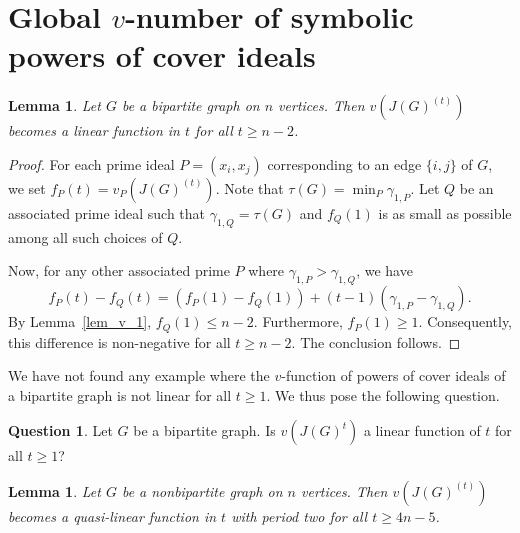 \documentclass[12pt,amscd]{amsart}
\newtheorem{lem}[thm]{Lemma}
\theoremstyle{definition}
\newtheorem{quest}[thm]{Question}
\numberwithin{equation}{section}
\begin{document}
\section{Global $v$-number of symbolic powers of cover ideals}

\begin{lem} \label{lem:2} 
Let $G$ be a bipartite graph on $n$ vertices. Then $v(J(G)^{(t)})$ becomes a linear function in $t$ for all $t \ge n-2$.
\end{lem}

\begin{proof} 
For each prime ideal $P = (x_i,x_j)$ corresponding to an edge $\{i,j\}$ of $G$, we set $f_P(t) = v_P(J(G)^{(t)})$. Note that $\tau(G) = \min_{P} \gamma_{1,P}$. Let $Q$ be an associated prime ideal such that $\gamma_{1,Q} = \tau(G)$ and $f_Q(1)$ is as small as possible among all such choices of $Q$.

Now, for any other associated prime $P$ where $\gamma_{1,P} > \gamma_{1,Q}$, we have 
\[
f_P(t) - f_Q(t) = (f_P(1) - f_Q(1)) + (t-1)(\gamma_{1,P} - \gamma_{1,Q}).
\]
By Lemma~\ref{lem_v_1}, $f_Q(1) \le n-2$. Furthermore, $f_P(1) \ge 1$. Consequently, this difference is non-negative for all $t \ge n-2$. The conclusion follows.
\end{proof}

We have not found any example where the $v$-function of powers of cover ideals of a bipartite graph is not linear for all $t \ge 1$. We thus pose the following question.

\begin{quest} Let $G$ be a bipartite graph. Is $v(J(G)^{t})$ a linear function of $t$ for all $t \ge 1$?
\end{quest}

\begin{lem} \label{lem:3} 
Let $G$ be a nonbipartite graph on $n$ vertices. Then $v(J(G)^{(t)})$ becomes a quasi-linear function in $t$ with period two for all $t \ge 4n-5$.
\end{lem}
\end{document}

